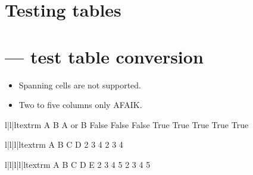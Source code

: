 \ifx\locallinewidth\undefined\newlength{\locallinewidth}\fi
\setlength{\locallinewidth}{\linewidth}


\section{Testing tables\label{-testing-tables}}
\section{ --- test table conversion}


\hspace*{\fill}\hrulefill\hspace*{\fill}

\begin{itemize}
\item {} 
Spanning cells are not supported.

\item {} 
Two to five columns only AFAIK.

\end{itemize}
\begin{tableiii}{l|l|l}{textrm}
{
A
}
{
B
}
{
A or B
}
{
False
}
{
False
}
{
False
}
{
True
}
{
True
}
{
True
}
{
True
}
{
True
}
\end{tableiii}
\begin{tableiv}{l|l|l|l}{textrm}
{
A
}
{
B
}
{
C
}
{
D
}
{
2
}
{
3
}
{
4
}
{
2
}
{
3
}
{
4
}
\end{tableiv}
\begin{tablev}{l|l|l|l|l}{textrm}
{
A
}
{
B
}
{
C
}
{
D
}
{
E
}
{
2
}
{
3
}
{
4
}
{
5
}
{
2
}
{
3
}
{
4
}
{
5
}
\end{tablev}

